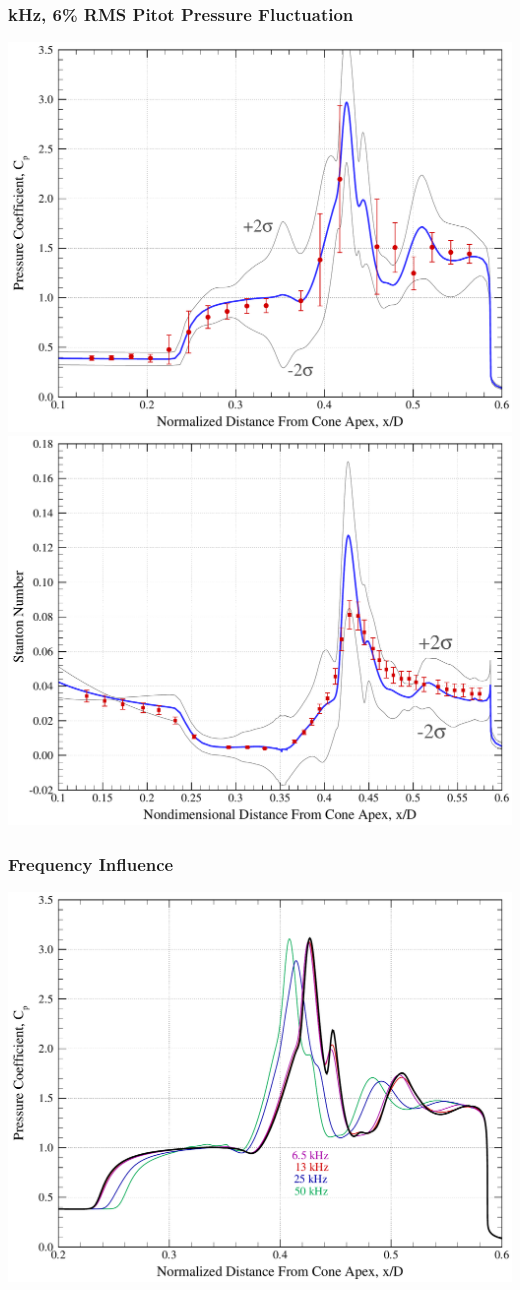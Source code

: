 \documentclass[compress,11pt]{beamer}
\begin{document}
\frame
{
\frametitle{\scriptsize \unit[25]{kHz}, 6\% RMS Pitot Pressure Fluctuation}
\begin{center}
  \includegraphics[width=.48\textwidth]{figures/aedc_double_cone/2894/Cp_25kHz_6percent}\hspace{.5em}
  \includegraphics[width=.48\textwidth]{figures/aedc_double_cone/2894/St_25kHz_6percent}
\end{center}
}

\frame
{
\frametitle{\scriptsize Frequency Influence}
\begin{center}
  \includegraphics[height=.85\textheight]{figures/aedc_double_cone/2894/Cp_freq_comp}
\end{center}
}
\end{document}
